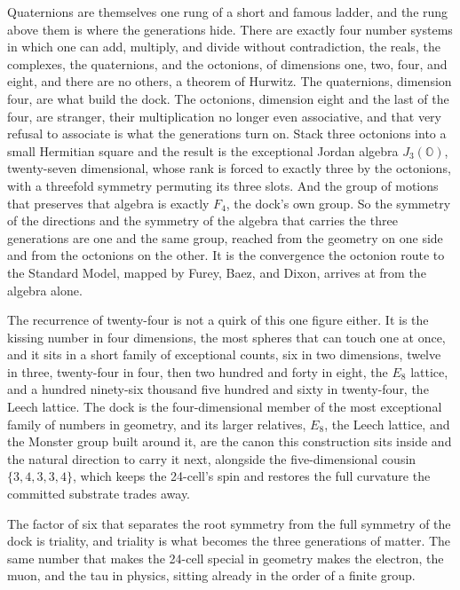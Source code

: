 Quaternions are themselves one rung of a short and famous ladder, and the rung above them is where the generations hide. There are exactly four number systems in which one can add, multiply, and divide without contradiction, the reals, the complexes, the quaternions, and the octonions, of dimensions one, two, four, and eight, and there are no others, a theorem of Hurwitz. The quaternions, dimension four, are what build the dock. The octonions, dimension eight and the last of the four, are stranger, their multiplication no longer even associative, and that very refusal to associate is what the generations turn on. Stack three octonions into a small Hermitian square and the result is the exceptional Jordan algebra $J_3(\mathbb{O})$, twenty-seven dimensional, whose rank is forced to exactly three by the octonions, with a threefold symmetry permuting its three slots. And the group of motions that preserves that algebra is exactly $F_4$, the dock's own group. So the symmetry of the directions and the symmetry of the algebra that carries the three generations are one and the same group, reached from the geometry on one side and from the octonions on the other. It is the convergence the octonion route to the Standard Model, mapped by Furey, Baez, and Dixon, arrives at from the algebra alone.

The recurrence of twenty-four is not a quirk of this one figure either. It is the kissing number in four dimensions, the most spheres that can touch one at once, and it sits in a short family of exceptional counts, six in two dimensions, twelve in three, twenty-four in four, then two hundred and forty in eight, the $E_8$ lattice, and a hundred ninety-six thousand five hundred and sixty in twenty-four, the Leech lattice. The dock is the four-dimensional member of the most exceptional family of numbers in geometry, and its larger relatives, $E_8$, the Leech lattice, and the Monster group built around it, are the canon this construction sits inside and the natural direction to carry it next, alongside the five-dimensional cousin $\{3,4,3,3,4\}$, which keeps the 24-cell's spin and restores the full curvature the committed substrate trades away.

The factor of six that separates the root symmetry from the full symmetry of the dock is triality, and triality is what becomes the three generations of matter. The same number that makes the 24-cell special in geometry makes the electron, the muon, and the tau in physics, sitting already in the order of a finite group.

